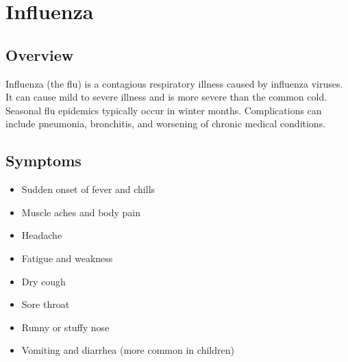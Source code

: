 \chapter{Influenza}

\section*{Overview}
Influenza (the flu) is a contagious respiratory illness caused by influenza viruses. It can cause mild to severe illness and is more severe than the common cold. Seasonal flu epidemics typically occur in winter months. Complications can include pneumonia, bronchitis, and worsening of chronic medical conditions.

\section*{Symptoms}
\begin{itemize}
  \item Sudden onset of fever and chills
\end{itemize}

\begin{itemize}
  \item Muscle aches and body pain
\end{itemize}

\begin{itemize}
  \item Headache
\end{itemize}

\begin{itemize}
  \item Fatigue and weakness
\end{itemize}

\begin{itemize}
  \item Dry cough
\end{itemize}

\begin{itemize}
  \item Sore throat
\end{itemize}

\begin{itemize}
  \item Runny or stuffy nose
\end{itemize}

\begin{itemize}
  \item Vomiting and diarrhea (more common in children)
\end{itemize}

